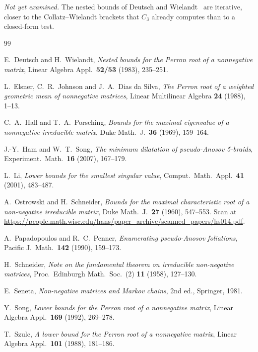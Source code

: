 \documentclass[11pt]{amsart}
\theoremstyle{plain}
\theoremstyle{definition}
\begin{document}
\emph{Not yet examined.}  The nested bounds of Deutsch and
Wielandt~\cite{DeutschWielandt} are iterative, closer to the
Collatz--Wielandt brackets that $C_3$ already computes than to a
closed-form test.

\begin{thebibliography}{99}

E.~Deutsch and H.~Wielandt, \emph{Nested bounds for the Perron root of a
  nonnegative matrix}, Linear Algebra Appl.\ \textbf{52/53} (1983),
  235--251.

L.~Elsner, C.~R.~Johnson and J.~A.~Dias da Silva, \emph{The Perron root of
  a weighted geometric mean of nonnegative matrices}, Linear Multilinear
  Algebra \textbf{24} (1988), 1--13.

C.~A.~Hall and T.~A.~Porsching, \emph{Bounds for the maximal eigenvalue of
  a nonnegative irreducible matrix}, Duke Math.\ J.\ \textbf{36} (1969),
  159--164.

J.-Y.~Ham and W.~T.~Song, \emph{The minimum dilatation of pseudo-Anosov
  5-braids}, Experiment.\ Math.\ \textbf{16} (2007), 167--179.

L.~Li, \emph{Lower bounds for the smallest singular value}, Comput.\
  Math.\ Appl.\ \textbf{41} (2001), 483--487.

A.~Ostrowski and H.~Schneider, \emph{Bounds for the maximal characteristic
  root of a non-negative irreducible matrix}, Duke Math.\ J.\ \textbf{27}
  (1960), 547--553.  Scan at
  \url{https://people.math.wisc.edu/hans/paper_archive/scanned_papers/hs014.pdf}.

A.~Papadopoulos and R.~C.~Penner, \emph{Enumerating pseudo-Anosov
  foliations}, Pacific J.\ Math.\ \textbf{142} (1990), 159--173.

H.~Schneider, \emph{Note on the fundamental theorem on irreducible
  non-negative matrices}, Proc.\ Edinburgh Math.\ Soc.\ (2) \textbf{11}
  (1958), 127--130.

E.~Seneta, \emph{Non-negative matrices and Markov chains}, 2nd ed.,
  Springer, 1981.

Y.~Song, \emph{Lower bounds for the Perron root of a nonnegative matrix},
  Linear Algebra Appl.\ \textbf{169} (1992), 269--278.

T.~Szulc, \emph{A lower bound for the Perron root of a nonnegative
  matrix}, Linear Algebra Appl.\ \textbf{101} (1988), 181--186.

\end{thebibliography}
\end{document}
